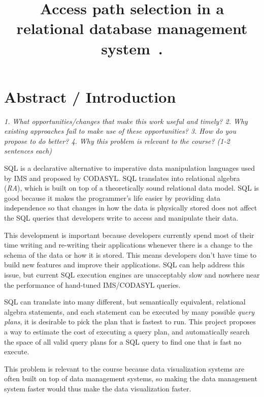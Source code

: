 \documentclass{proc}
\begin{document}
\title{Access path selection in a relational database management system~\cite{selinger1979access}.}


\maketitle

\section{Abstract / Introduction}

\emph{1. What opportunities/changes that make this work useful and timely?
2. Why existing approaches fail to make use of these opportunities?
3. How do you propose to do better?
4. Why this problem is relevant to the course?
(1-2 sentences each)} 

SQL is a declarative alternative to imperative data manipulation languages used by IMS and proposed by CODASYL.   
SQL translates into relational algebra (\emph{RA}), which is built on top of a theoretically sound relational data model.  
SQL is good because it makes the programmer's life easier by providing data independence so that changes in how the data is physically stored does not affect the SQL queries that developers write to access and manipulate their data.

This development is important because developers currently spend most of their time writing and re-writing their applications whenever there is a change to the schema of the data or how it is stored.  This means developers don't have time to build new features and improve their applications.  SQL can help address this issue, but current SQL execution engines are unacceptably slow and nowhere near the performance of hand-tuned IMS/CODASYL queries.

SQL can translate into many different, but semantically equivalent, relational algebra statements, and each statement can be executed by many possible \emph{query plans},  it is desirable to pick the plan that is fastest to run. This project proposes a way to estimate the cost of executing a query plan, and automatically search the space of all valid query plans for a SQL query to find one that is fast no execute. 

This problem is relevant to the course because data visualization systems are often built on top of data management systems, so making the data management system faster would thus make the data visualization faster.
\end{document}
